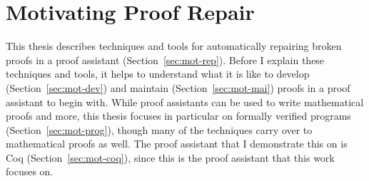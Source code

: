\chapter{Motivating Proof Repair}

This thesis describes techniques and tools for automatically repairing broken proofs in a proof assistant (Section~\ref{sec:mot-rep}).
Before I explain these techniques and tools, it helps to understand what it is like to develop (Section~\ref{sec:mot-dev}) and maintain (Section~\ref{sec:mot-mai}) proofs in a proof assistant to begin with.
While proof assistants can be used to write mathematical proofs and more,
this thesis focuses in particular on formally verified programs (Section~\ref{sec:mot-prog}), though many of the techniques carry over to mathematical proofs as well.
The proof assistant that I demonstrate this on is Coq (Section~\ref{sec:mot-coq}), since this is the proof assistant that this work focuses on.










